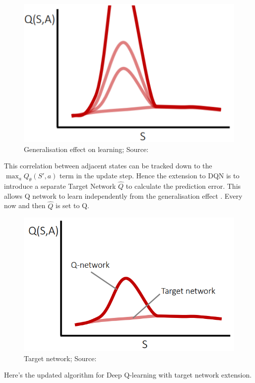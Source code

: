 \begin{figure}[h!h!h!h]
\includegraphics[scale=0.5]{figures/target 4.PNG}
  \caption{Generalisation effect on learning; Source: \cite{lecture_dqn}}
  \label{fig:generalisation_curse}
\end{figure}

This correlation between adjacent states can be tracked down to the $\max_a Q_{\theta}(S', a)$ term in the update step. Hence the 
extension to DQN is to introduce a separate Target Network $\hat{Q}$ to calculate the prediction error. This allows Q network to learn independently from the generalisation effect \cite{lecture_dqn}. Every now and then $\hat{Q}$ is set to Q.

\begin{figure}[H]
\centering
\includegraphics[scale=0.4]{figures/target 0.PNG}
  \caption{Target network; Source: \cite{lecture_dqn}}
  \label{fig:target_network}
\end{figure}

Here's the updated algorithm for Deep Q-learning with target network extension.

